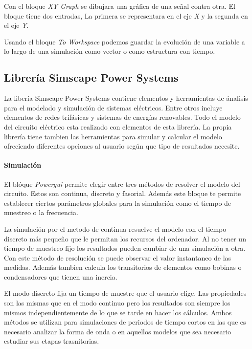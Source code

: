 \documentclass{book}
\begin{document}
Con el bloque \emph{XY Graph} se dibujara una gr\'afica de una señal contra otra. El bloque tiene dos entradas, La primera se representara en el eje \emph{X} y la segunda en el eje \emph{Y}.  \par

Usando el bloque \emph{To Workspace} podemos guardar la evoluci\'on de una variable a lo largo de una simulaci\'on como vector o como estructura con tiempo.  \par

		\subsection{Librer\'ia Simscape Power Systems}

La liber\'ia Simscape Power Systems contiene elementos y herramientas de \'analisis para el modelado y simulaci\'on de sistemas el\'ectricos. Entre otros incluye elementos de redes trif\'asicas y sistemas de energ\'ias renovables. Todo el modelo del circuito el\'ectrico esta realizado con elementos de esta librer\'ia. La propia librer\'ia tiene tambien las herramientas para simular y calcular el modelo ofreciendo diferentes opciones al usuario seg\'un que tipo de resultados necesite. \par

		\paragraph {Simulaci\'on}
El bl\'oque \emph{Powergui} permite elegir entre tres m\'etodos de resolver el modelo del circuito. Estos son continua, discreto y fasorial. Adem\'as este bloque te permite establecer ciertos par\'ametros globales para la simulaci\'on como el tiempo de muestreo o la frecuencia.  \par

La simulaci\'on por el metodo de continua resuelve el modelo con el tiempo discreto m\'as pequeño que le permitan los recursos del ordenador. Al no tener un tiempo de muestreo fijo los resultados pueden cambiar de una simulaci\'on a otra. Con este m\'etodo de resoluci\'on se puede observar el valor instantaneo de las medidas. Adem\'as tambien calcula  los transitorios de elementos como bobinas o condensadores que tienen una inercia. \par

El modo discreto fija un tiempo de muestre que el usuario elige. Las propiedades son las mismas que en el modo continuo pero los resultados son siempre los mismos independientemente de lo que se tarde en hacer los c\'alculos. Ambos m\'etodos se utilizan para simulaciones de periodos de tiempo cortos en las que es necesario analizar la forma de onda o en aquellos modelos que sea necesario estudiar sus etapas trasnitorias. \par
\end{document}
